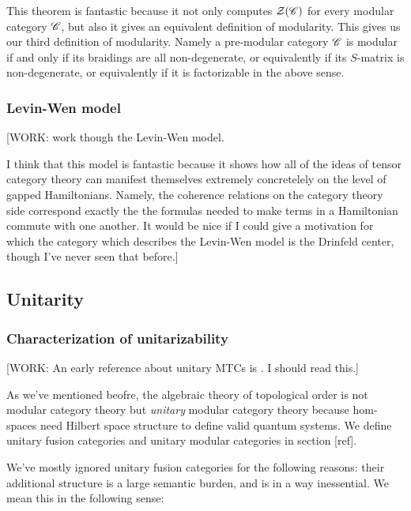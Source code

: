 This theorem is fantastic because it not only computes $\mathcal{Z}(\mathscr{C})$ for every modular category $\mathscr{C}$, but also it gives an equivalent definition of modularity. This gives us our third definition of modularity. Namely a pre-modular category $\mathscr{C}$ is modular if and only if its braidings are all non-degenerate, or equivalently if its $S$-matrix is non-degenerate, or equivalently if it is factorizable in the above sense.

\subsubsection{Levin-Wen model}

[WORK: work though the Levin-Wen model.

I think that this model is fantastic because it shows how all of the ideas of tensor category theory can manifest themselves extremely concretelely on the level of gapped Hamiltonians. Namely, the coherence relations on the category theory side correspond exactly the the formulas needed to make terms in a Hamiltonian commute with one another. It would be nice if I could give a motivation for which the category which describes the Levin-Wen model is the Drinfeld center, though I've never seen that before.]




\subsection{Unitarity}

\subsubsection{Characterization of unitarizability}

[WORK: An early reference about unitary MTCs is \cite{kirillov1996inner}. I should read this.]

As we've mentioned beofre, the algebraic theory of topological order is not modular category theory but \textit{unitary} modular category theory because hom-spaces need Hilbert space structure to define valid quantum systems. We define unitary fusion categories and unitary modular categories in section [ref].

We've mostly ignored unitary fusion categories for the following reasons: their additional structure is a large semantic burden, and is in a way inessential. We mean this in the following sense:

